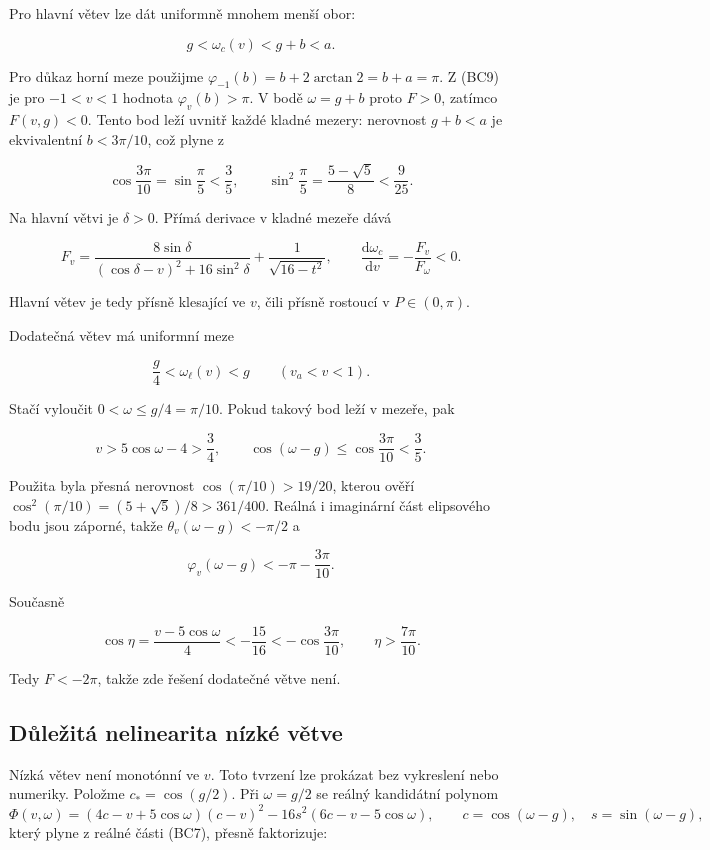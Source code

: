 \documentclass[11pt,a4paper]{article}
\theoremstyle{remark}\newtheorem{remark}[theorem]{Poznámka}
\numberwithin{equation}{section}
\begin{document}
Pro hlavní větev lze dát uniformně mnohem menší obor:

\[
\boxed{g<\omega_c(v)<g+b<a.}
\tag{BC20}
\]

Pro důkaz horní meze použijme \(\varphi_{-1}(b)=b+2\arctan2=b+a=\pi\). Z
(BC9) je pro \(-1<v<1\) hodnota \(\varphi_v(b)>\pi\). V bodě
\(\omega=g+b\) proto \(F>0\), zatímco \(F(v,g)<0\). Tento bod leží
uvnitř každé kladné mezery: nerovnost \(g+b<a\) je ekvivalentní
\(b<3\pi/10\), což plyne z

\[
\cos\frac{3\pi}{10}=\sin\frac\pi5<\frac35,
\qquad
\sin^2\frac\pi5=\frac{5-\sqrt5}{8}<\frac9{25}.
\]

Na hlavní větvi je \(\delta>0\). Přímá derivace v kladné mezeře dává

\[
F_v=
\frac{8\sin\delta}
     {(\cos\delta-v)^2+16\sin^2\delta}
+\frac1{\sqrt{16-t^2}},
\qquad
\frac{\mathrm d\omega_c}{\mathrm dv}=-\frac{F_v}{F_\omega}<0.
\tag{BC21}
\]

Hlavní větev je tedy přísně klesající ve \(v\), čili přísně rostoucí v
\(P\in(0,\pi)\).

Dodatečná větev má uniformní meze

\[
\boxed{\frac g4<\omega_\ell(v)<g\qquad(v_a<v<1).}
\tag{BC22}
\]

Stačí vyloučit \(0<\omega\le g/4=\pi/10\). Pokud takový bod leží v
mezeře, pak

\[
v>5\cos\omega-4>\frac34,
\qquad
\cos(\omega-g)\le\cos\frac{3\pi}{10}<\frac35.
\]

Použita byla přesná nerovnost \(\cos(\pi/10)>19/20\), kterou ověří
\(\cos^2(\pi/10)=(5+\sqrt5)/8>361/400\). Reálná i imaginární část
elipsového bodu jsou záporné, takže \(\theta_v(\omega-g)<-\pi/2\) a

\[
\varphi_v(\omega-g)<-\pi-\frac{3\pi}{10}.
\]

Současně

\[
\cos\eta=\frac{v-5\cos\omega}{4}
< -\frac{15}{16}
< -\cos\frac{3\pi}{10},
\qquad \eta>\frac{7\pi}{10}.
\]

Tedy \(F<-2\pi\), takže zde řešení dodatečné větve není.

\hypertarget{dux16fleux17eituxe1-nelinearita-nuxedzkuxe9-vux11btve}{%
\subsection{Důležitá nelinearita nízké
větve}\label{dux16fleux17eituxe1-nelinearita-nuxedzkuxe9-vux11btve}}

Nízká větev není monotónní ve \(v\). Toto tvrzení lze prokázat bez
vykreslení nebo numeriky. Položme \(c_*=\cos(g/2)\). Při \(\omega=g/2\)
se reálný kandidátní polynom \[
\Phi(v,\omega)
=(4c-v+5\cos\omega)(c-v)^2
-16s^2(6c-v-5\cos\omega),\qquad
c=\cos(\omega-g),\quad s=\sin(\omega-g),
\] který plyne z reálné části (BC7), přesně faktorizuje:
\end{document}
